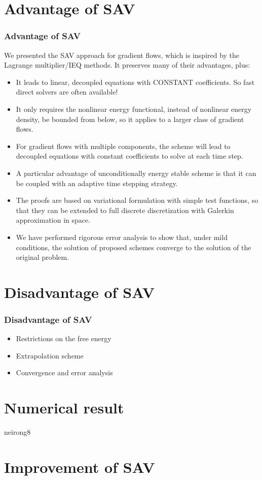 \documentclass{beamer}
\begin{document}
\section{Advantage of SAV}
\begin{frame}
\frametitle{Advantage of SAV}
We presented the SAV approach for gradient flows, which is inspired by the Lagrange multiplier/IEQ methods. It preserves many of their advantages, plus:
\begin{itemize}
  \item It leads to linear, decoupled equations with CONSTANT coefficients. So fast direct solvers are often available!
  \item It only requires the nonlinear energy functional, instead of nonlinear energy density, be bounded from below, so it applies to a larger class of gradient flows.
  \item For gradient flows with multiple components, the scheme will lead to decoupled equations with constant coefficients to solve at each time step.
\end{itemize}
\end{frame}
\begin{frame}
\begin{itemize}
  \item A particular advantage of unconditionally energy stable scheme is that it can be coupled with an adaptive time stepping strategy.
  \item The proofs are based on variational formulation with simple test functions, so that they can be extended to full discrete discretization with Galerkin approximation in space.
  \item We have performed rigorous error analysis to show that, under mild conditions, the solution of proposed schemes converge to the solution of the original problem.
\end{itemize}
\end{frame}

\section{Disadvantage of SAV}

    \begin{frame}
\frametitle{Disadvantage of SAV}
    \begin{itemize}
      \item Restrictions on the free energy
      \item Extrapolation scheme
      \item Convergence and error analysis
    \end{itemize}


    \end{frame}
\section{Numerical result}
    \begin{frame}

        neirong8

    \end{frame}
\section{Improvement of SAV}
\end{document}
